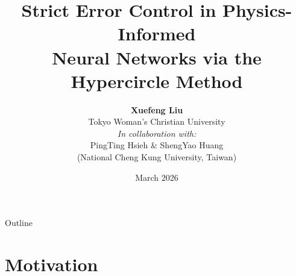\documentclass[10pt,aspectratio=169]{beamer}
\title[Hypercircle PINNs]{\textbf{Strict Error Control in Physics-Informed\\Neural Networks via the Hypercircle Method}}
\author[X.~Liu]{%
  \textbf{Xuefeng Liu}\\[2pt]
  {\small Tokyo Woman's Christian University}\\[4pt]
  {\footnotesize\itshape In collaboration with:}\\[1pt]
  {\footnotesize PingTing Hsieh \& ShengYao Huang}\\
  {\footnotesize (National Cheng Kung University, Taiwan)}%
}
\date{March 2026}
\begin{document}

\begin{frame}
  \titlepage
\end{frame}

\begin{frame}{Outline}
  \tableofcontents
\end{frame}

\section{Motivation}
\end{document}
